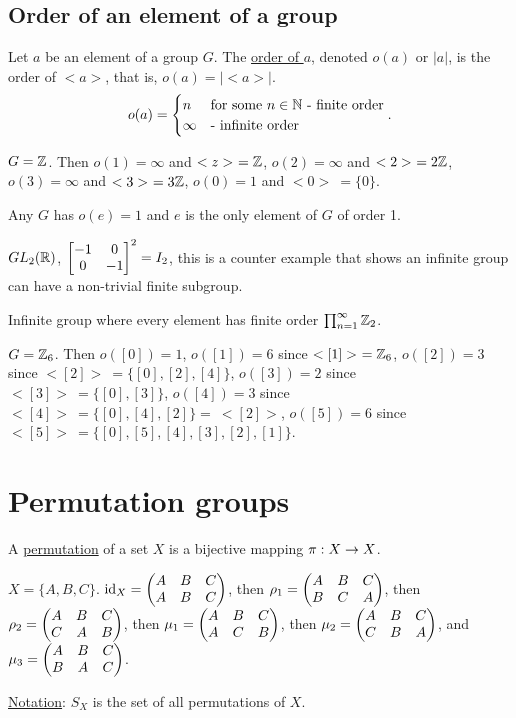 \documentclass[]{article}
\begin{document}
\subsection{Order of an element of a group}
\begin{definition}
	Let $a$ be an element of a group $G$. The \ul{order of $a$}, denoted $o(a)$ or $|a|$, is the order of $<a>$, that is, $o(a) = |<a>|$.
	$$o(a) = \begin{cases} n & \text{for some } n\in\mathbb{N} \text{ - finite order} \\ \infty & \text{- infinite order} \end{cases}. $$
\end{definition}
\begin{example}
	$G = \mathbb{Z}$. Then $o(1) = \infty$ and $<z>\ = \mathbb{Z}$, $o(2) = \infty$ and $<2>\ = 2\mathbb{Z}$, $o(3) = \infty$ and $<3>\ = 3\mathbb{Z}$, $o(0) = 1$ and $<0>\ = \{0\}$.
\end{example}
\begin{note}
	Any $G$ has $o(e) = 1$ and $e$ is the only element of $G$ of order 1.
\end{note}
\begin{example}
	$GL_2(\mathbb{R})$, $\begin{bmatrix}-1&0 \\0&-1\end{bmatrix}^2 = I_2$, this is a counter example that shows an infinite group can have a non-trivial finite subgroup.
\end{example}
\begin{example}
	Infinite group where every element has finite order $\prod_{n=1}^\infty \mathbb{Z}_2$.
\end{example}
\begin{example}
	$G = \mathbb{Z}_6$. Then $o([0]) = 1$, $o([1]) = 6$ since $<[1]>\ = \mathbb{Z}_6$, $o([2]) = 3$ since $<[2]>\ = \{[0],[2],[4]\}$, $o([3]) = 2$ since $<[3]>\ = \{[0],[3]\}$, $o([4]) = 3$ since $<[4]>\ = \{[0],[4],[2]\} =\ <[2]>$, $o([5]) = 6$ since $<[5]>\ = \{[0],[5],[4],[3],[2],[1]\}$.
\end{example}

\section{Permutation groups}

\begin{definition}
	A \ul{permutation} of a set $X$ is a bijective mapping $\pi: X\rightarrow X$.
\end{definition}
\begin{example}
	$X = \{A,B,C\}$. $\text{id}_X = \begin{pmatrix}A&B&C\\A&B&C\end{pmatrix}$, then $\rho_1 = \begin{pmatrix}A&B&C \\ B&C&A\end{pmatrix}$, then $\rho_2 = \begin{pmatrix}A&B&C\\C&A&B\end{pmatrix}$, then $\mu_1 = \begin{pmatrix}A&B&C\\A&C&B\end{pmatrix}$, then $\mu_2 = \begin{pmatrix}A&B&C\\C&B&A\end{pmatrix}$, and $\mu_3 = \begin{pmatrix}A&B&C\\B&A&C\end{pmatrix}$.
\end{example}
\ul{Notation}: $S_X$ is the set of all permutations of $X$.
\end{document}
